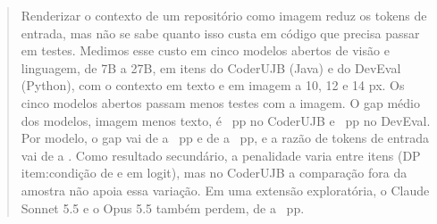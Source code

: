 \begin{abstract}
Renderizar o contexto de um repositório como imagem reduz os tokens de entrada, mas não se sabe quanto isso custa em código que precisa passar em testes. Medimos esse custo em cinco modelos abertos de visão e linguagem, de 7B a 27B, em \nItemsAll itens do CoderUJB (Java) e do DevEval (Python), com o contexto em texto e em imagem a 10, 12 e 14 px. Os cinco modelos abertos passam menos testes com a imagem. O gap médio dos modelos, imagem menos texto, é \gapMeanUjb~pp \ci{\gapMeanUjbLo}{\gapMeanUjbHi} no CoderUJB e \gapMeanDev~pp \ci{\gapMeanDevLo}{\gapMeanDevHi} no DevEval. Por modelo, o gap vai de \gapMinUjb{} a \gapMaxUjb~pp e de \gapMinDev{} a \gapMaxDev~pp, e a razão de tokens de entrada vai de \tokenRatioMinAll{} a \tokenRatioMaxAll. Como resultado secundário, a penalidade varia entre itens (DP item:condição de \sdItemConditionUjb{} e \sdItemConditionDev{} em logit), mas no CoderUJB a comparação fora da amostra não apoia essa variação. Em uma extensão exploratória, o Claude Sonnet 5.5 e o Opus 5.5 também perdem, de \claudeLossMinAll{} a \claudeLossMaxAll~pp.
\end{abstract}
